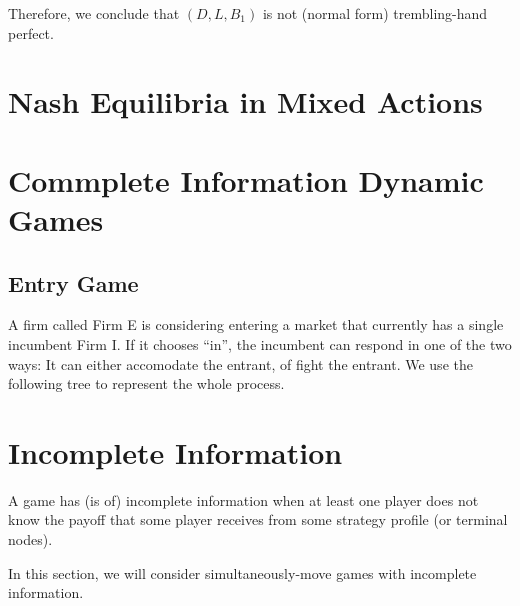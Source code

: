\documentclass[12pt, oneside]{article}
\begin{document}
Therefore, we conclude that $(D, L, B_1)$ is not (normal form) trembling-hand perfect.

\section{Nash Equilibria in Mixed Actions}
\section{Commplete Information Dynamic Games}
\subsection{Entry Game}
A firm called Firm E is considering entering a market that currently has a single incumbent Firm I. If it chooses “in”, the incumbent can respond in one of the two ways: It can either accomodate the entrant, of fight the entrant. We use the following tree to represent the whole process.



\section{Incomplete Information}
A game has (is of) incomplete information when at least one player does not know the payoff that some player receives from some strategy profile (or terminal nodes).

In this section, we will consider simultaneously-move games with incomplete information.
\end{document}
